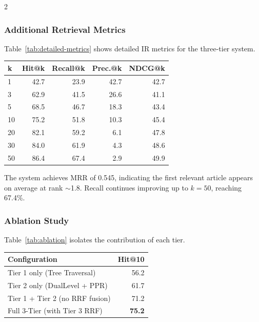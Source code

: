 \documentclass[11pt,a4paper]{article}
\begin{document}
\begin{multicols}{2}

\subsubsection{Additional Retrieval Metrics}

Table~\ref{tab:detailed-metrics} shows detailed IR metrics for the three-tier system.

\vspace{0.3em}
\noindent
\centering\small
{}
\label{tab:detailed-metrics}
\begin{tabular}{lrrrr}
\toprule
\textbf{k} & \textbf{Hit@k} & \textbf{Recall@k} & \textbf{Prec.@k} & \textbf{NDCG@k} \\
\midrule
1 & 42.7 & 23.9 & 42.7 & 42.7 \\
3 & 62.9 & 41.5 & 26.6 & 41.1 \\
5 & 68.5 & 46.7 & 18.3 & 43.4 \\
10 & 75.2 & 51.8 & 10.3 & 45.4 \\
20 & 82.1 & 59.2 & 6.1 & 47.8 \\
30 & 84.0 & 61.9 & 4.3 & 48.6 \\
50 & 86.4 & 67.4 & 2.9 & 49.9 \\
\bottomrule
\end{tabular}
\normalsize
\justifying
\vspace{0.3em}

The system achieves MRR of 0.545, indicating the first relevant article appears on average at rank $\sim$1.8. Recall continues improving up to $k=50$, reaching 67.4\%.

\subsubsection{Ablation Study}

Table~\ref{tab:ablation} isolates the contribution of each tier.

\vspace{0.3em}
\noindent
\centering\small
{}
\label{tab:ablation}
\begin{tabular}{lr}
\toprule
\textbf{Configuration} & \textbf{Hit@10} \\
\midrule
Tier 1 only (Tree Traversal) & 56.2 \\
Tier 2 only (DualLevel + PPR) & 61.7 \\
Tier 1 + Tier 2 (no RRF fusion) & 71.2 \\
Full 3-Tier (with Tier 3 RRF) & \textbf{75.2} \\
\bottomrule
\end{tabular}
\normalsize
\justifying
\vspace{0.3em}


\end{multicols}
\end{document}
